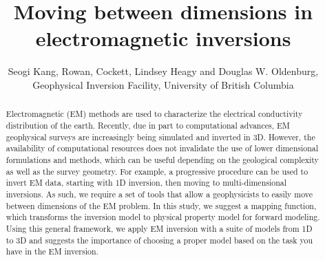 \documentclass{segabs}
\begin{document}
\title{Moving between dimensions in electromagnetic inversions}

\renewcommand{\thefootnote}{\fnsymbol{footnote}}

\author{Seogi Kang\footnotemark[1], Rowan, Cockett, Lindsey Heagy and Douglas W. Oldenburg, Geophysical Inversion Facility, University of British Columbia}


\maketitle
\begin{abstract}
Electromagnetic (EM) methods are used to characterize the electrical conductivity distribution of the earth. Recently, due in part to computational advances, EM geophysical surveys are increasingly being simulated and inverted in 3D. However, the availability of computational resources does not invalidate the use of lower dimensional formulations and methods, which can be useful depending on the geological complexity as well as the survey geometry. For example, a progressive procedure can be used to invert EM data, starting with 1D inversion, then moving to multi-dimensional inversions. As such, we require a set of tools that allow a geophysicists to easily move between dimensions of the EM problem. In this study, we suggest a mapping function, which transforms the inversion model to physical property model for forward modeling. Using this general framework, we apply EM inversion with a suite of models from 1D to 3D and suggests the importance of choosing a proper model based on the task you have in the EM inversion. 
\end{abstract}
\renewcommand{\figdir}{Fig} %
\end{document}
